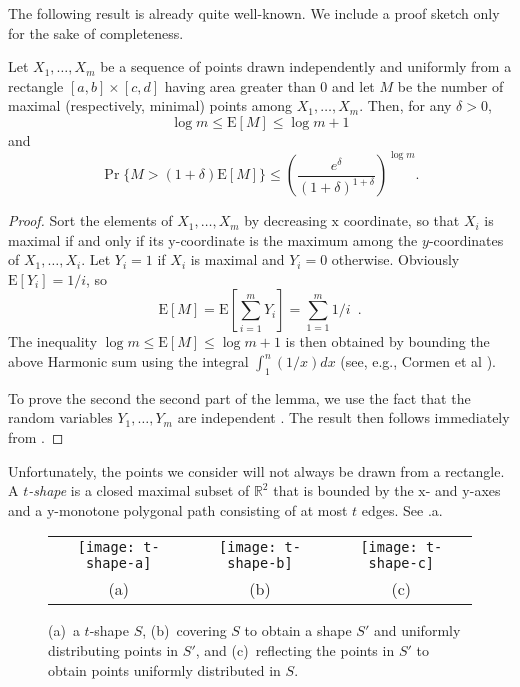 \documentclass[lotsofwhite,charterfonts]{patmorin}
\newcommand{\RR}{\mathbb{R}}
\newcommand{\PROB}{\Pr}
\newcommand{\EXP}{\mathrm{E}}
\begin{document}
The following result is already quite well-known.  We include a
proof sketch only for the sake of completeness.

\begin{lem}
  Let $X_1,\ldots,X_m$ be a sequence of points drawn independently and
  uniformly from a rectangle $[a,b]\times[c,d]$ having area greater than
  0 and let $M$ be the number of maximal (respectively, minimal) points
  among $X_1,\ldots,X_m$.  Then, for any $\delta >0$,
  \begin{equation}
    \log m \le \EXP[M] \le \log m + 1
  \end{equation}
  and 
  \begin{equation}
    \PROB\{M>(1+\delta)\EXP[M]\} 
        \le \left(\frac{e^\delta}{(1+\delta)^{1+\delta}}\right)^{\log m} .
  \end{equation}
\end{lem}

\begin{proof}
Sort the elements of $X_1,\ldots,X_m$ by decreasing $\mathrm{x}$
coordinate, so that $X_i$ is maximal if and only if its
$\mathrm{y}$-coordinate is the maximum among the $y$-coordinates of
$X_1,\ldots,X_i$.  Let $Y_i=1$ if $X_i$ is maximal and $Y_i=0$ otherwise.
Obviously $\EXP[Y_i]=1/i$, so
\[
   \EXP[M] = \EXP\left[\sum_{i=1}^m Y_i\right] = \sum_{1=1}^m 1/i \enspace .
\]
The inequality $\log m \le \EXP[M]\le \log m + 1$ is then obtained by
bounding the above Harmonic sum using the integral $\int_{1}^{n}(1/x)dx$
(see, e.g., Cormen et al \cite[Appendix A.2]{clrs06}).

To prove the second the second part of the lemma, we use the fact
that the random variables $Y_1,\ldots,Y_m$ are independent \cite{d88,g78}.
The result then follows immediately from .
\end{proof}

Unfortunately, the points we consider will not always be drawn from a
rectangle.  A \emph{$t$-shape} is a closed maximal subset of $\RR^2$ that
is bounded by the $\mathrm x$- and $\mathrm y$-axes and a $\mathrm
y$-monotone polygonal path consisting of at most $t$ edges.  See
.a.

\begin{figure}
  \begin{center}
    \begin{tabular}{ccc}
      \texttt{[image: t-shape-a]} & 
      \texttt{[image: t-shape-b]} & 
      \texttt{[image: t-shape-c]} \\
      (a) & (b) & (c)
    \end{tabular}
  \end{center}
  \caption{(a)~a $t$-shape $S$, (b)~covering $S$ to obtain a shape $S'$ and
uniformly distributing points in $S'$, and (c)~reflecting the points in
$S'$ to obtain points uniformly distributed in $S$.}
\end{figure}
\end{document}
